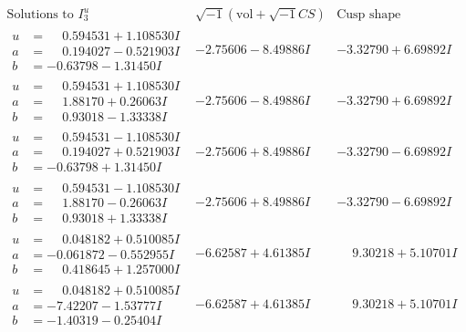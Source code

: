 \documentclass[1p]{elsarticle_modified}
\theoremstyle{definition}
\newcommand{\I}{\sqrt{-1}}
\begin{document}
$$\begin{array}{c|c|c}  
\text{Solutions to }I^u_{3}& \I (\text{vol} + \sqrt{-1}CS) & \text{Cusp shape}\\
 \hline 
\begin{aligned}
u &= \phantom{-}0.594531 + 1.108530 I \\
a &= \phantom{-}0.194027 - 0.521903 I \\
b &= -0.63798 - 1.31450 I\end{aligned}
 & -2.75606 - 8.49886 I & -3.32790 + 6.69892 I \\ \hline\begin{aligned}
u &= \phantom{-}0.594531 + 1.108530 I \\
a &= \phantom{-}1.88170 + 0.26063 I \\
b &= \phantom{-}0.93018 - 1.33338 I\end{aligned}
 & -2.75606 - 8.49886 I & -3.32790 + 6.69892 I \\ \hline\begin{aligned}
u &= \phantom{-}0.594531 - 1.108530 I \\
a &= \phantom{-}0.194027 + 0.521903 I \\
b &= -0.63798 + 1.31450 I\end{aligned}
 & -2.75606 + 8.49886 I & -3.32790 - 6.69892 I \\ \hline\begin{aligned}
u &= \phantom{-}0.594531 - 1.108530 I \\
a &= \phantom{-}1.88170 - 0.26063 I \\
b &= \phantom{-}0.93018 + 1.33338 I\end{aligned}
 & -2.75606 + 8.49886 I & -3.32790 - 6.69892 I \\ \hline\begin{aligned}
u &= \phantom{-}0.048182 + 0.510085 I \\
a &= -0.061872 - 0.552955 I \\
b &= \phantom{-}0.418645 + 1.257000 I\end{aligned}
 & -6.62587 + 4.61385 I & \phantom{-}9.30218 + 5.10701 I \\ \hline\begin{aligned}
u &= \phantom{-}0.048182 + 0.510085 I \\
a &= -7.42207 - 1.53777 I \\
b &= -1.40319 - 0.25404 I\end{aligned}
 & -6.62587 + 4.61385 I & \phantom{-}9.30218 + 5.10701 I \\ \hline\begin{aligned}

\end{aligned}
\end{array}$$
\end{document}
